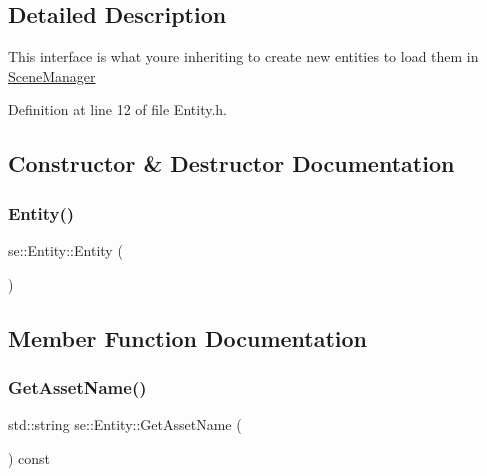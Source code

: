 \subsection{Detailed Description}
This interface is what you\textquotesingle{}re inheriting to create new entities to load them in \mbox{\hyperlink{classse_1_1_scene_manager}{Scene\+Manager}} 

Definition at line 12 of file Entity.\+h.



\subsection{Constructor \& Destructor Documentation}
\mbox{\label{classse_1_1_entity_ac92492302d50c22ba7c4e9ff016b6145}} 
\subsubsection{\texorpdfstring{Entity()}{Entity()}}
{\footnotesize\ttfamily se\+::\+Entity\+::\+Entity (\begin{DoxyParamCaption}{ }\end{DoxyParamCaption})}



\subsection{Member Function Documentation}
\mbox{\label{classse_1_1_entity_af1d512cba984ffe167decd7ecf7a88f4}} 
\subsubsection{\texorpdfstring{Get\+Asset\+Name()}{GetAssetName()}}
{\footnotesize\ttfamily std\+::string se\+::\+Entity\+::\+Get\+Asset\+Name (\begin{DoxyParamCaption}{ }\end{DoxyParamCaption}) const}

\mbox{\label{classse_1_1_entity_a677f32cd82e63f814b4be91518263242}} 

